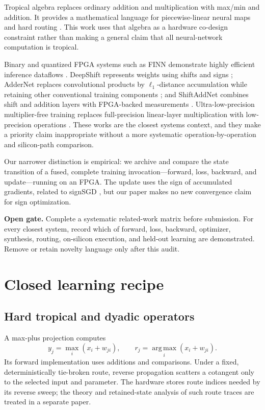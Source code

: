 \documentclass[10pt]{article}
\newcommand{\gate}[1]{\textcolor{orange!55!black}{\textbf{Open gate.} #1}}
\begin{document}
Tropical algebra replaces ordinary addition and multiplication with max/min
and addition.  It provides a mathematical language for piecewise-linear neural
maps and hard routing \cite{zhang2018tropical}.  This work uses that algebra as
a hardware co-design constraint rather than making a general claim that all
neural-network computation is tropical.

Binary and quantized FPGA systems such as FINN demonstrate highly efficient
inference dataflows \cite{umuroglu2017finn}.  DeepShift represents weights using
shifts and signs \cite{deepShift}; AdderNet replaces convolutional products by
$\ell_1$-distance accumulation while retaining other conventional training
components \cite{addernet}; and ShiftAddNet combines shift and addition layers
with FPGA-backed measurements \cite{shiftaddnet}.  Ultra-low-precision
multiplier-free training replaces full-precision linear-layer multiplication
with low-precision operations \cite{liu2023multfree}.  These works are the
closest systems context, and they make a priority claim inappropriate without
a more systematic operation-by-operation and silicon-path comparison.

Our narrower distinction is empirical: we archive and compare the state
transition of a fused, complete training invocation---forward, loss, backward,
and update---running on an FPGA.  The update uses the sign of accumulated
gradients, related to signSGD \cite{bernstein2018signsgd}, but our paper makes no
new convergence claim for sign optimization.

\gate{Complete a systematic related-work matrix before submission.  For every
closest system, record which of forward, loss, backward, optimizer, synthesis,
routing, on-silicon execution, and held-out learning are demonstrated.  Remove
or retain novelty language only after this audit.}

\section{Closed learning recipe}

\subsection{Hard tropical and dyadic operators}

A max-plus projection computes
\begin{equation}
  y_j = \max_i \left(x_i + w_{ji}\right), \qquad
  r_j = \operatorname*{arg\,max}_i \left(x_i + w_{ji}\right).
\end{equation}
Its forward implementation uses additions and comparisons.  Under a fixed,
deterministically tie-broken route, reverse propagation scatters a cotangent
only to the selected input and parameter.  The hardware stores route indices
needed by its reverse sweep; the theory and retained-state analysis of such
route traces are treated in a separate paper.
\end{document}
